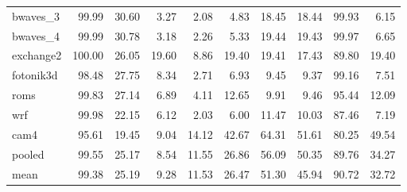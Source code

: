 \documentclass[10pt,a4paper]{article}
\begin{document}
{\begin{longtable}{@{}lrrrrrrrrr@{}}
bwaves\_3 & 99.99 & 30.60 & 3.27 & 2.08 & 4.83 & 18.45 & 18.44 & 99.93 & 6.15 \\
bwaves\_4 & 99.99 & 30.78 & 3.18 & 2.26 & 5.33 & 19.44 & 19.43 & 99.97 & 6.65 \\
exchange2 & 100.00 & 26.05 & 19.60 & 8.86 & 19.40 & 19.41 & 17.43 & 89.80 & 19.40 \\
fotonik3d & 98.48 & 27.75 & 8.34 & 2.71 & 6.93 & 9.45 & 9.37 & 99.16 & 7.51 \\
roms & 99.83 & 27.14 & 6.89 & 4.11 & 12.65 & 9.91 & 9.46 & 95.44 & 12.09 \\
wrf & 99.98 & 22.15 & 6.12 & 2.03 & 6.00 & 11.47 & 10.03 & 87.46 & 7.19 \\
cam4 & 95.61 & 19.45 & 9.04 & 14.12 & 42.67 & 64.31 & 51.61 & 80.25 & 49.54 \\
\midrule
pooled & 99.55 & 25.17 & 8.54 & 11.55 & 26.86 & 56.09 & 50.35 & 89.76 & 34.27 \\
mean & 99.38 & 25.19 & 9.28 & 11.53 & 26.47 & 51.30 & 45.94 & 90.72 & 32.72 \\
\end{longtable}
}
\end{document}
